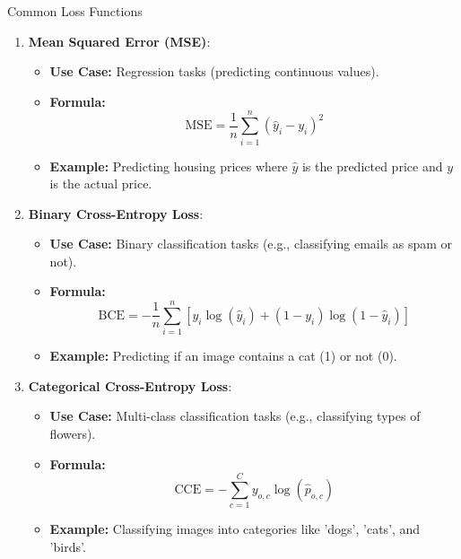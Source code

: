 \documentclass[aspectratio=169]{beamer}
\begin{document}
\begin{frame}[fragile]{Common Loss Functions}
    \begin{enumerate}
        \item \textbf{Mean Squared Error (MSE)}:
        \begin{itemize}
            \item \textbf{Use Case:} Regression tasks (predicting continuous values).
            \item \textbf{Formula:} 
            \begin{equation}
                \text{MSE} = \frac{1}{n} \sum_{i=1}^{n} (\hat{y}_i - y_i)^2
            \end{equation}
            \item \textbf{Example:} Predicting housing prices where \( \hat{y} \) is the predicted price and \( y \) is the actual price.
        \end{itemize}
        
        \item \textbf{Binary Cross-Entropy Loss}:
        \begin{itemize}
            \item \textbf{Use Case:} Binary classification tasks (e.g., classifying emails as spam or not).
            \item \textbf{Formula:}
            \begin{equation}
                \text{BCE} = -\frac{1}{n} \sum_{i=1}^{n} [y_i \log(\hat{y}_i) + (1 - y_i) \log(1 - \hat{y}_i)]
            \end{equation}
            \item \textbf{Example:} Predicting if an image contains a cat (1) or not (0).
        \end{itemize}
        
        \item \textbf{Categorical Cross-Entropy Loss}:
        \begin{itemize}
            \item \textbf{Use Case:} Multi-class classification tasks (e.g., classifying types of flowers).
            \item \textbf{Formula:}
            \begin{equation}
                \text{CCE} = -\sum_{c=1}^{C} y_{o,c} \log(\hat{p}_{o,c})
            \end{equation}
            \item \textbf{Example:} Classifying images into categories like 'dogs', 'cats', and 'birds'.
        \end{itemize}
    \end{enumerate}
\end{frame}
\end{document}
